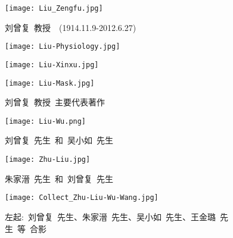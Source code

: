 \newpage
\pagestyle{empty}    %
\begin{figure}[h!]
\centering
\vspace{+0.2in}
\texttt{[image: Liu\_Zengfu.jpg]}
\caption*{\hei 刘曾复~教授~~(1914.11.9-2012.6.27)}
\label{Liu_Zengfu}
\end{figure}

\newpage
\begin{figure}[h!]
\centering
\vspace{-0.2in}
\texttt{[image: Liu-Physiology.jpg]}
\label{Liu-Physiology}
\end{figure}
\begin{figure}[hbtp!]
\hspace*{-0.4in}
\begin{minipage}[t]{0.48\textwidth}
	\centering
\texttt{[image: Liu-Xinxu.jpg]}
\end{minipage}
\hspace{0.3in}
\begin{minipage}[t]{0.48\textwidth}
	\centering
\texttt{[image: Liu-Mask.jpg]}
\end{minipage}
\vspace{1.0pt}
\caption*{\hei 刘曾复~教授~主要代表著作}
\label{Major_Works}
\end{figure}

\newpage
\begin{figure}[h!]
\centering
\texttt{[image: Liu-Wu.png]}
\caption*{\hei 刘曾复~先生~和~吴小如~先生}
\label{Collect_Liu_Wu}
\end{figure}

\newpage
\begin{figure}[h!]
\centering
\texttt{[image: Zhu-Liu.jpg]}
\caption*{\hei 朱家溍~先生~和~刘曾复~先生}
\label{Collect_Zhu_Wu}
\end{figure}

\begin{figure}[h!]
\centering
\texttt{[image: Collect\_Zhu-Liu-Wu-Wang.jpg]}
\caption*{\hei 左起:~刘曾复~先生、朱家溍~先生、吴小如~先生、王金璐~先生~等~合影}
\label{Collect_Liy_Zhu_Wu_Wang}
\end{figure}


